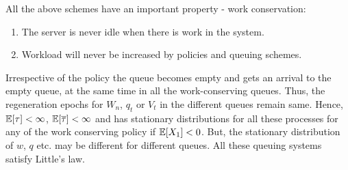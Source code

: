 \documentclass[all-lectures.tex]{subfiles}
\begin{document}
All  the above schemes have an important property - work conservation:
\begin{enumerate}
\item The server is never idle when there is work in the system.
\item Workload will never be increased by policies and queuing schemes. 
\end{enumerate}
\indent Irrespective of the policy the queue becomes empty and gets an arrival to the empty queue, at the same time in all the work-conserving queues. Thus, the  regeneration epochs for $W_n$, $q_t$ or $V_t$ in the different queues remain same. Hence, $\mathbb{E}[\tau]< \infty$, $\mathbb{E}[\overline{\tau}] < \infty$ and has stationary distributions for all these processes for any of the work conserving policy if $\mathbb{E}[X_1] < 0$. But, the stationary distribution of $w$, $q$ etc. may be different for different queues. All these queuing systems satisfy Little's law.

\end{document}
